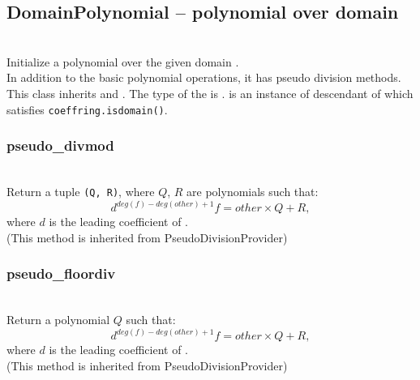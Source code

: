  \subsection{DomainPolynomial -- polynomial over domain}
 \initialize
  \\
  \spacing
  \quad Initialize a polynomial over the given domain .\\
  \spacing
  \quad In addition to the basic polynomial operations,
  it has pseudo division methods.\\
  \spacing
  \quad This class inherits  and
  .
  \spacing
  \quad The type of the  is .
   is an instance of descendant of  which satisfies {\tt coeffring.isdomain()}.\\
  \spacing
  \method
  \subsubsection{pseudo\_divmod}
  \\
  \spacing
  \quad Return a tuple {\tt (Q, R)},
  where \(Q\), \(R\) are polynomials such that:
  \[ d^{deg(f) - deg(other) + 1} f = other \times Q + R,\]
  where \(d\) is the leading coefficient of .\\
  (This method is inherited from PseudoDivisionProvider)

  \subsubsection{pseudo\_floordiv}
  \\
  \spacing
  \quad Return a polynomial \(Q\) such that:
  \[ d^{deg(f) - deg(other) + 1} f = other \times Q + R,\]
  where \(d\) is the leading coefficient of .\\
  (This method is inherited from PseudoDivisionProvider)

